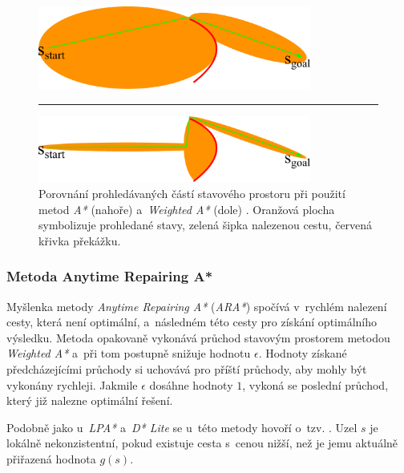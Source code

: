 \begin{figure}[ht]
    \begin{center}
        \includegraphics[width=0.8\textwidth]{obrazky-figures/astar-search-space.pdf}
        \medskip
        \rule{0.8\textwidth}{0.4pt}
        \medskip
        \includegraphics[width=0.8\textwidth]{obrazky-figures/weighted-astar-search-space.pdf}
    \end{center}
    \caption{Porovnání prohledávaných částí stavového prostoru při použití metod \emph{A*} (nahoře) a~\emph{Weighted A*} (dole) \cite{Likachev_astar_weighted_astar}. Oranžová plocha symbolizuje prohledané stavy, zelená šipka nalezenou cestu, červená křivka překážku.}
    \label{fig:astar-wighted-astar-search-space}
\end{figure}

\subsubsection*{Metoda Anytime Repairing A*}

Myšlenka metody \emph{Anytime Repairing A*} (\emph{ARA*}) \cite{ARA_star} spočívá v~rychlém nalezení cesty, která není optimální, a~následném  této cesty pro získání optimálního výsledku. Metoda opakovaně vykonává průchod stavovým prostorem metodou \emph{Weighted A*} a~při tom postupně snižuje hodnotu $\epsilon$. Hodnoty získané předcházejícími průchody si uchovává pro příští průchody, aby mohly být vykonány rychleji. Jakmile $\epsilon$ dosáhne hodnoty $1$, vykoná se poslední průchod, který již nalezne optimální řešení.

Podobně jako u~\emph{LPA*} a~\emph{D* Lite} se u~této metody hovoří o~tzv. . Uzel $s$ je lokálně nekonzistentní, pokud existuje cesta s~cenou nižší, než je jemu aktuálně přiřazená hodnota $g(s)$.

